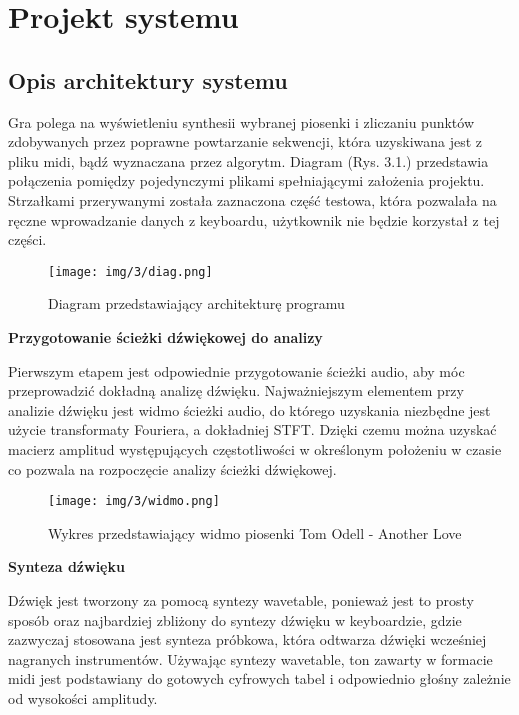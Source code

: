 \chapter{Projekt systemu}
\vspace{-25pt}
\section{Opis architektury systemu}
Gra polega na wyświetleniu synthesii wybranej piosenki i zliczaniu punktów zdobywanych przez poprawne powtarzanie sekwencji, która uzyskiwana jest z pliku midi, bądź wyznaczana przez algorytm. Diagram (Rys. 3.1.) przedstawia połączenia pomiędzy pojedynczymi plikami spełniającymi założenia projektu. Strzałkami przerywanymi została zaznaczona część testowa, która pozwalała na ręczne wprowadzanie danych z keyboardu, użytkownik nie będzie korzystał z tej części.

\begin{figure}[h]
  \centering
  \texttt{[image: img/3/diag.png]}
  \caption{Diagram przedstawiający architekturę programu}
\end{figure}

\noindent\textbf{Przygotowanie ścieżki dźwiękowej do analizy}

Pierwszym etapem jest odpowiednie przygotowanie ścieżki audio, aby móc przeprowadzić dokładną analizę dźwięku. Najważniejszym elementem przy analizie dźwięku jest widmo ścieżki audio, do którego uzyskania niezbędne jest użycie transformaty Fouriera, a dokładniej STFT. Dzięki czemu można uzyskać macierz amplitud występujących częstotliwości w określonym położeniu w czasie co pozwala na rozpoczęcie analizy ścieżki dźwiękowej.

\begin{figure}[h]
  \centering
  \texttt{[image: img/3/widmo.png]}
  \caption{Wykres przedstawiający widmo piosenki Tom Odell - Another Love}
\end{figure}

\noindent\textbf{Synteza dźwięku}

Dźwięk jest tworzony za pomocą syntezy wavetable, ponieważ jest to prosty sposób oraz najbardziej zbliżony do syntezy dźwięku w keyboardzie, gdzie zazwyczaj stosowana jest synteza próbkowa, która odtwarza dźwięki wcześniej nagranych instrumentów. Używając syntezy wavetable, ton zawarty w formacie midi jest podstawiany do gotowych cyfrowych tabel i odpowiednio głośny zależnie od wysokości amplitudy.\\


